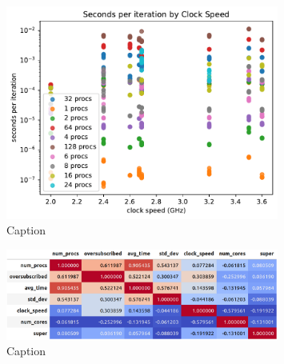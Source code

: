 \documentclass{article}
\begin{document}
\begin{figure}[h]
    \centering
    \includegraphics[width=0.8\textwidth]{figures/final/correlation.pdf}
    \caption{Caption}
    \label{fig:correlation}
\end{figure}

\begin{figure}[h]
    \centering
    \includegraphics[width=0.8\textwidth]{figures/final/xcorr.png}
    \caption{Caption}
    \label{fig:xcorrelation}
\end{figure}
\end{document}

